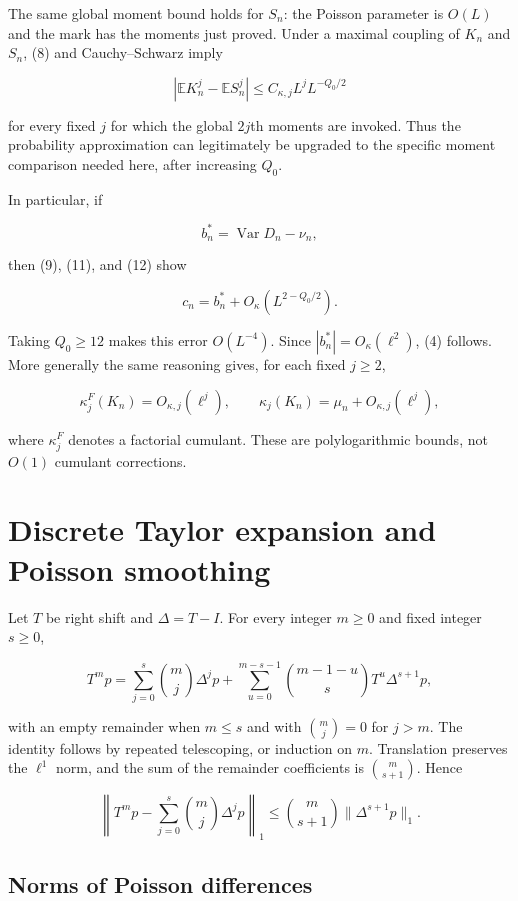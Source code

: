 \documentclass[
  11pt,
]{article}
\begin{document}
The same global moment bound holds for \(S_n\): the Poisson parameter is
\(O(L)\) and the mark has the moments just proved. Under a maximal
coupling of \(K_n\) and \(S_n\), (8) and Cauchy--Schwarz imply

\[
|\mathbb EK_n^j-\mathbb ES_n^j|
\le C_{\kappa,j}L^j L^{-Q_0/2}
\tag{12}
\]

for every fixed \(j\) for which the global \(2j\)th moments are invoked.
Thus the probability approximation can legitimately be upgraded to the
specific moment comparison needed here, after increasing \(Q_0\).

In particular, if

\[
b_n^*=\operatorname{Var}D_n-\nu_n,
\]

then (9), (11), and (12) show

\[
c_n=b_n^*+O_\kappa(L^{2-Q_0/2}).
\tag{13}
\]

Taking \(Q_0\ge12\) makes this error \(O(L^{-4})\). Since
\(|b_n^*|=O_\kappa(\ell^2)\), (4) follows. More generally the same
reasoning gives, for each fixed \(j\ge2\),

\[
\kappa_j^F(K_n)=O_{\kappa,j}(\ell^j),\qquad
\kappa_j(K_n)=\mu_n+O_{\kappa,j}(\ell^j),
\tag{14}
\]

where \(\kappa_j^F\) denotes a factorial cumulant. These are
polylogarithmic bounds, not \(O(1)\) cumulant corrections.

\section{Discrete Taylor expansion and Poisson
smoothing}\label{discrete-taylor-expansion-and-poisson-smoothing}

Let \(T\) be right shift and \(\Delta=T-I\). For every integer \(m\ge0\)
and fixed integer \(s\ge0\),

\[
T^mp=\sum_{j=0}^s\binom mj\Delta^jp
+\sum_{u=0}^{m-s-1}\binom{m-1-u}{s}T^u\Delta^{s+1}p,
\tag{15}
\]

with an empty remainder when \(m\le s\) and with \(\binom mj=0\) for
\(j>m\). The identity follows by repeated telescoping, or induction on
\(m\). Translation preserves the \(\ell^1\) norm, and the sum of the
remainder coefficients is \(\binom m{s+1}\). Hence

\[
\left\|T^mp-\sum_{j=0}^s\binom mj\Delta^jp\right\|_1
\le\binom m{s+1}\|\Delta^{s+1}p\|_1.
\tag{16}
\]

\subsection{Norms of Poisson
differences}\label{norms-of-poisson-differences}
\end{document}
